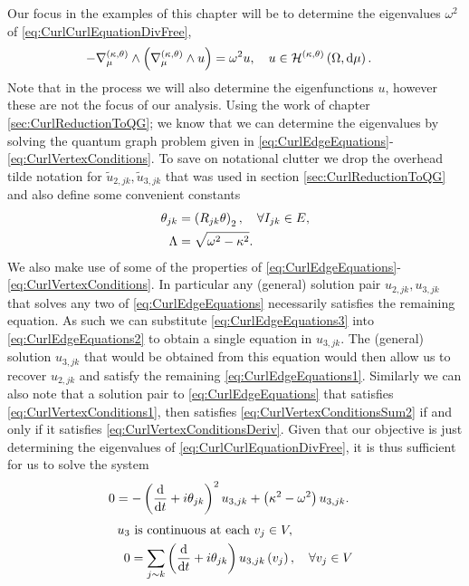 Our focus in the examples of this chapter will be to determine the eigenvalues $\omega^2$ of \eqref{eq:CurlCurlEquationDivFree},
\begin{align*}
	-\nabla_{\mu}^{\left( \kappa, \theta \right)}\wedge\left( \nabla_{\mu}^{\left( \kappa, \theta \right)}\wedge u \right) &= \omega^2 u, \quad u\in\mathcal{H}^{\left( \kappa, \theta \right)}\left( \Omega, \mathrm{d}\mu \right).
\end{align*}
Note that in the process we will also determine the eigenfunctions $u$, however these are not the focus of our analysis.
Using the work of chapter \ref{sec:CurlReductionToQG}; we know that we can determine the eigenvalues by solving the quantum graph problem given in \eqref{eq:CurlEdgeEquations}-\eqref{eq:CurlVertexConditions}.
To save on notational clutter we drop the overhead tilde notation for $\widetilde{u}_{2,jk},\widetilde{u}_{3,jk}$ that was used in section \ref{sec:CurlReductionToQG} and also define some convenient constants
\begin{align*}
	\theta_{jk} &= \left( R_{jk}\theta \right)_2, \quad \forall I_{jk}\in E,\\
	\Lambda &= \sqrt{\omega^2 - \kappa^2}.
\end{align*}
We also make use of some of the properties of \eqref{eq:CurlEdgeEquations}-\eqref{eq:CurlVertexConditions}.
In particular any (general) solution pair $u_{2,jk},u_{3,jk}$ that solves any two of \eqref{eq:CurlEdgeEquations} necessarily satisfies the remaining equation.
As such we can substitute \eqref{eq:CurlEdgeEquations3} into \eqref{eq:CurlEdgeEquations2} to obtain a single equation in $u_{3,jk}$.
The (general) solution $u_{3,jk}$ that would be obtained from this equation would then allow us to recover $u_{2,jk}$ and satisfy the remaining \eqref{eq:CurlEdgeEquations1}.
Similarly we can also note that a solution pair to \eqref{eq:CurlEdgeEquations} that satisfies \eqref{eq:CurlVertexConditions1}, then satisfies \eqref{eq:CurlVertexConditionsSum2} if and only if it satisfies \eqref{eq:CurlVertexConditionsDeriv}.
Given that our objective is just determining the eigenvalues of \eqref{eq:CurlCurlEquationDivFree}, it is thus sufficient for us to solve the system
\begin{align} \label{eq:QGEquation}
	0 &= -\left( \dfrac{\mathrm{d}}{\mathrm{d}t} + i\theta_{jk} \right)^2 u_{3,jk} + \left( \kappa^2 - \omega^2 \right)u_{3,jk}.
\end{align}
\begin{subequations} \label{eq:QGVertexConditions}
	\begin{align}
		u_3 &\text{ is continuous at each } v_j\in V, \\
		0 &= \sum_{j\sim k} \left( \dfrac{\mathrm{d}}{\mathrm{d}t} + i\theta_{jk} \right)u_{3,jk}\left( v_j \right), \quad\forall v_j\in V
	\end{align}
\end{subequations}
